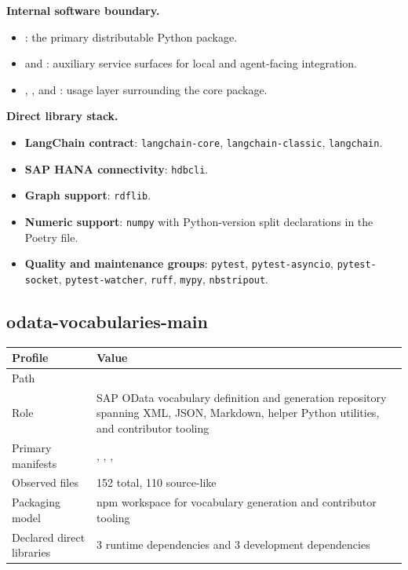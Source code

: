 \documentclass[11pt,a4paper]{article}
\begin{document}
\textbf{Internal software boundary.}
\begin{itemize}[leftmargin=*]
    \item {}: the primary distributable Python package.
    \item {} and : auxiliary service surfaces for local and agent-facing integration.
    \item {}, , and : usage layer surrounding the core package.
\end{itemize}

\textbf{Direct library stack.}
\begin{itemize}[leftmargin=*]
    \item \textbf{LangChain contract}: \texttt{langchain-core}, \texttt{langchain-classic}, \texttt{langchain}.
    \item \textbf{SAP HANA connectivity}: \texttt{hdbcli}.
    \item \textbf{Graph support}: \texttt{rdflib}.
    \item \textbf{Numeric support}: \texttt{numpy} with Python-version split declarations in the Poetry file.
    \item \textbf{Quality and maintenance groups}: \texttt{pytest}, \texttt{pytest-asyncio}, \texttt{pytest-socket}, \texttt{pytest-watcher}, \texttt{ruff}, \texttt{mypy}, \texttt{nbstripout}.
\end{itemize}

\subsection{odata-vocabularies-main}

\begin{tabular}{@{}P{4.2cm}P{9.8cm}@{}}
\toprule
\textbf{Profile} & \textbf{Value} \\
\midrule
Path &  \\
Role & SAP OData vocabulary definition and generation repository spanning XML, JSON, Markdown, helper Python utilities, and contributor tooling \\
Primary manifests & , , ,  \\
Observed files & 152 total, 110 source-like \\
Packaging model & npm workspace for vocabulary generation and contributor tooling \\
Declared direct libraries & 3 runtime dependencies and 3 development dependencies \\
\bottomrule
\end{tabular}
\end{document}

